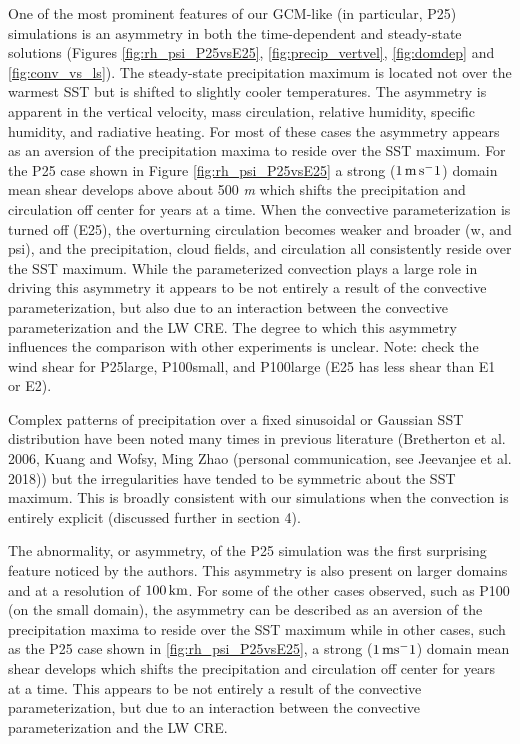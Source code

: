 \documentclass[11pt]{article}   	%
\begin{document}
One of the most prominent features of our GCM-like (in particular, P25) simulations is an asymmetry in both the time-dependent and 
steady-state solutions (Figures \ref{fig:rh_psi_P25vsE25},  \ref{fig:precip_vertvel}, \ref{fig:domdep} and  \ref{fig:conv_vs_ls}).  The steady-state precipitation maximum is located  not over the warmest SST but is
shifted to slightly cooler temperatures.  The asymmetry is apparent in the vertical velocity, mass circulation, relative humidity, 
specific humidity, and radiative heating.  
For most of these cases the asymmetry appears as an aversion of the precipitation maxima to reside over the SST maximum.  
For the P25 case shown in Figure \ref{fig:rh_psi_P25vsE25} a strong ($1 \, \rm{m \, s^-1}$) domain
mean shear develops above about 500 \textit{m} which shifts the precipitation and circulation off center for years at a time.
When the convective parameterization
is turned off (E25), the overturning circulation becomes weaker and broader (w, and psi), and the precipitation, cloud fields, and 
circulation all consistently reside over the SST maximum.   
While the parameterized convection plays a large role in driving this asymmetry it appears to be not entirely a 
result of the convective parameterization, but also due to an interaction between the convective 
parameterization and the LW CRE.   The degree to which this asymmetry influences the comparison with other experiments is 
unclear.    Note: check the wind shear for P25large, P100small, and P100large (E25 has less shear than E1 or E2). 

Complex patterns of precipitation over a fixed sinusoidal or Gaussian SST 
distribution have been noted many times in previous literature
(Bretherton et al. 2006, Kuang and Wofsy, Ming Zhao (personal communication, see Jeevanjee et al. 2018)) but the irregularities have 
tended to be symmetric about the SST maximum.  This is broadly consistent with our simulations when the convection is 
entirely explicit (discussed further in section 4).      

The abnormality, or asymmetry, of the P25 simulation was the first surprising feature noticed by the authors.
This asymmetry is also present on larger domains and at a resolution of $100 \, \rm{km}$.  For some of the other cases observed, such
as P100 (on the small domain), the asymmetry can be described as an aversion of the precipitation maxima to reside over the 
SST maximum while in other cases, such as the P25 case shown in \ref{fig:rh_psi_P25vsE25}, a strong ($1 \, \rm{m s^-1}$) domain
mean shear develops which shifts the precipitation and circulation off center for years at a time.  This appears to be not entirely a 
result of the convective parameterization, but due to an interaction between the convective parameterization and the LW CRE. 
\end{document}
